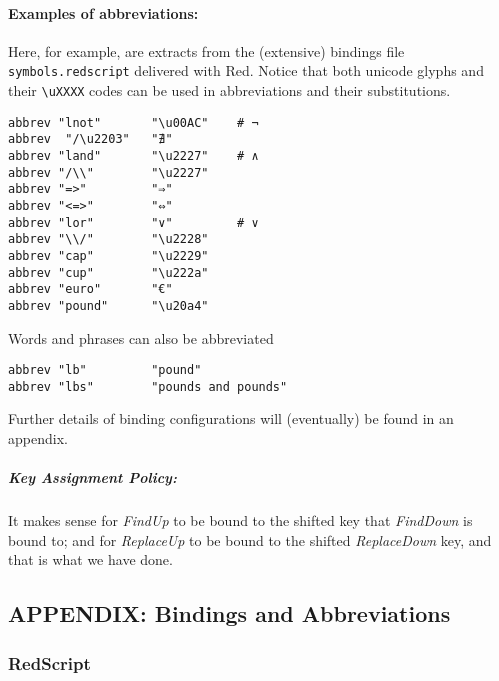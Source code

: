 \documentclass[
]{article}
\begin{document}
\hypertarget{examples-of-abbreviations}{%
\paragraph{Examples of abbreviations:}\label{examples-of-abbreviations}}

Here, for example, are extracts from the (extensive) bindings file
\texttt{symbols.redscript} delivered with Red. Notice that both unicode
glyphs and their
\texttt{\textbackslash{}u\textasciigrave{}\textasciigrave{}XXXX} codes
can be used in abbreviations and their substitutions.

\begin{verbatim}
abbrev "lnot"       "\u00AC"    # ¬
abbrev  "/\u2203"   "∄"
abbrev "land"       "\u2227"    # ∧
abbrev "/\\"        "\u2227" 
abbrev "=>"         "⇒" 
abbrev "<=>"        "⇔" 
abbrev "lor"        "∨"         # ∨
abbrev "\\/"        "\u2228"
abbrev "cap"        "\u2229" 
abbrev "cup"        "\u222a"  
abbrev "euro"       "€"  
abbrev "pound"      "\u20a4"
\end{verbatim}

Words and phrases can also be abbreviated

\begin{verbatim}
abbrev "lb"         "pound"
abbrev "lbs"        "pounds and pounds"
\end{verbatim}

Further details of binding configurations will (eventually) be found in
an appendix.

\hypertarget{key-assignment-policy}{%
\subparagraph{Key Assignment Policy:}\label{key-assignment-policy}}

It makes sense for \emph{FindUp} to be bound to the shifted key that
\emph{FindDown} is bound to; and for \emph{ReplaceUp} to be bound to the
shifted \emph{ReplaceDown} key, and that is what we have done.

\hypertarget{appendix-bindings-and-abbreviations}{%
\subsection{APPENDIX: Bindings and
Abbreviations}\label{appendix-bindings-and-abbreviations}}

\hypertarget{redscript}{%
\subsubsection{RedScript}\label{redscript}}
\end{document}
